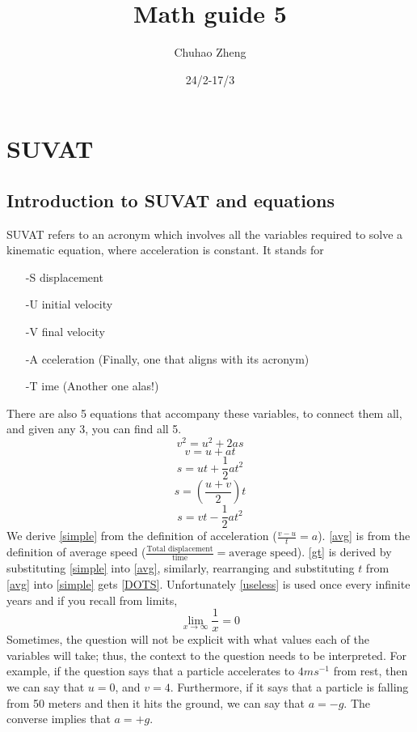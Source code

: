 \documentclass{article}
\title{Math guide 5}
\author{Chuhao Zheng}
\date{24/2-17/3}
\begin{document}
\maketitle
\tableofcontents
\newpage
\section{SUVAT}
\subsection{Introduction to SUVAT and equations}
{SUVAT refers to an acronym which involves all the variables required to solve a kinematic equation, where acceleration is constant. It stands for}
\begin{itemize}
\item[-S] displacement
\item[-U] initial velocity
\item[-V] final velocity  
\item[-A]cceleration (Finally, one that aligns with its acronym) 
\item[-T]ime (Another one alas!) 
\end{itemize}
{There are also 5 equations that accompany these variables, to connect them all, and given any 3, you can find all 5.}
\begin{equation}
    \label{DOTS}
    v^{2}=u^{2}+2as
\end{equation}
\begin{equation}
    \label{simple}
    v=u+at
\end{equation}
\begin{equation}
    \label{gt}
    s=ut+\frac{1}{2}at^2
\end{equation}
\begin{equation}
    \label{avg}
    s=\left(\frac{u+v}{2}\right)t
\end{equation}
\begin{equation}
\label{useless}
    s=vt-\frac{1}{2}at^2
\end{equation}
{We derive \ref{simple} from the definition of acceleration ($\frac{v-u}{t}=a$). \ref{avg} is from the definition of average speed ($\frac{\text{Total displacement}}{\text{time}}=\text{average speed}$). \ref{gt} is derived by substituting \ref{simple} into \ref{avg}, similarly, rearranging and substituting $t$ from \ref{avg} into \ref{simple} gets \ref{DOTS}. Unfortunately \ref{useless} is used once every infinite years and if you recall from limits, \[\lim_{x\to\infty} \frac{1}{x} = 0\]}
{Sometimes, the question will not be explicit with what values each of the variables will take; thus, the context to the question needs to be interpreted. For example, if the question says that a particle accelerates to $4ms^{-1}$ from rest, then we can say that $u=0$, and $v=4$. Furthermore, if it says that a particle is falling from 50 meters and then it hits the ground, we can say that $a=-g$. The converse implies that $a=+g$.}
\newpage
\end{document}
